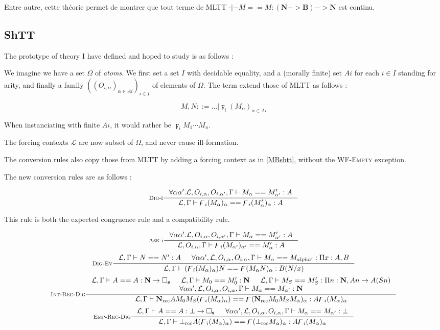 \documentclass{article}
\DeclareMathOperator{\rec}{rec}
\newcommand{\0}{\mathbf{0}}
\newcommand{\1}{\mathbf{1}}
\newcommand{\nat}{\mathbf{N}}
\newcommand{\bool}{\mathbf{B}}
\newcommand{\tctx}{\Gamma}
\newcommand{\slvl}{\mathbf{s}}
\newcommand{\fctx}{\mathcal{L}}
\begin{document}
Entre autre, cette théorie permet de montrer que tout terme de MLTT $\cdot |- M == M : (\nat -> \bool) -> \nat$ est continu.
\subsection{ShTT}

The prototype of theory I have defined and hoped to study is as follows :

We imagine we have a set $\Omega$ of \emph{atoms}.
We first set a set $I$ with decidable equality, and a (morally finite) set $A i$ for each $i \in I$ standing for arity, and finally a family $((O_{i,\alpha})_{\alpha \in A i})_{i\in I}$ of elements of $\Omega$. The term extend those of MLTT as follows :

$$ M, N ::= \dots | \digamma_i (M_\alpha)_{\alpha\in A i}$$

When instanciating with finite $A i$, it would rather be  $\digamma_i M_1 \cdots M_n$.

The forcing contexts $\fctx$ are now subset of $\Omega$, and never cause ill-formation.

The conversion rules also copy those from MLTT by adding a forcing context as in \ref{MBshtt}, without the \textsc{WF-Empty} exception.

The new conversion rules are as follows :

$$
    \inference[\textsc{Dig}-i]{\forall \alpha\alpha'. \fctx,O_{i,\alpha},O_{i,\alpha'},\tctx |- M_\alpha == M'_{\alpha'} : A}{\fctx,\tctx |- \digamma_i (M_\alpha)_\alpha == \digamma_i (M'_\alpha)_\alpha: A}
$$

This rule is both the expected congruence rule and a compatibility rule.

$$
    \inference[\textsc{Ask}-i]{\forall \alpha\alpha'. \fctx,O_{i,\alpha},O_{i,\alpha'},\tctx |- M_\alpha == M'_{\alpha'} : A}{\fctx,O_{i,\alpha},\tctx |- \digamma_i (M_{\alpha'})_{\alpha'} == M'_\alpha: A}
$$
$$
    \inference[\textsc{Dig-Ev}]{\fctx,\tctx |- N == N' : A & \forall \alpha \alpha', \fctx, O_{i,\alpha},O_{i,\alpha},\tctx |- M_\alpha == M_{alpha'} : \Pi x : A, B}{\fctx,\tctx |- (\digamma_i (M_\alpha)_\alpha) N == \digamma (M_\alpha N)_\alpha : B(N/x)}
$$
$$
    \inference[\textsc{Int-Rec-Dig}]{\fctx,\tctx |- A == A : \nat -> \square_\slvl & \fctx,\tctx |- M_0 == M'_0 : \nat & \fctx,\tctx |- M_S == M'_S : \Pi n : \nat, A n -> A (S n)\\ \forall \alpha \alpha', \fctx, O_{i,\alpha},O_{i,\alpha},\tctx |- M_\alpha == M_{\alpha'} : \nat}{\fctx,\tctx |- \nat_{\rec} AM_0M_S(\digamma_i (M_\alpha)_\alpha) == \digamma (\nat_{\rec}M_0M_SM_\alpha)_\alpha : A \digamma_i (M_\alpha)_\alpha}
$$
$$
    \inference[\textsc{Emp-Rec-Dig}]{\fctx,\tctx |- A == A : \bot -> \square_\slvl & \forall \alpha \alpha', \fctx, O_{i,\alpha},O_{i,\alpha},\tctx |- M_\alpha == M_{\alpha'} : \bot}{\fctx,\tctx |- \bot_{\rec} A(\digamma_i (M_\alpha)_\alpha) == \digamma (\bot_{\rec}M_\alpha)_\alpha : A \digamma_i (M_\alpha)_\alpha}
$$
\end{document}

